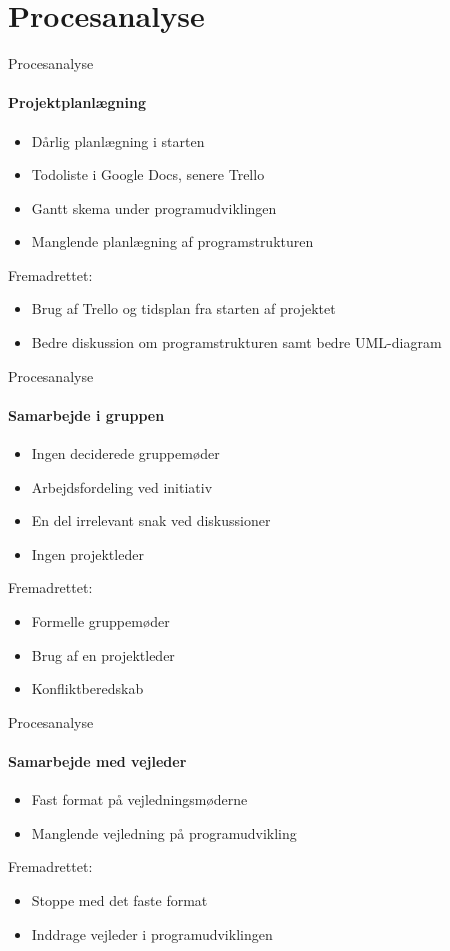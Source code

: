 \section{Procesanalyse}
\begin{frame}{Procesanalyse}
	\framesubtitle{Projektplanlægning}
	
	\begin{itemize}
		\item Dårlig planlægning i starten
		\item Todoliste i Google Docs, senere Trello
		\item Gantt skema under programudviklingen
		\item Manglende planlægning af programstrukturen
	\end{itemize}
		Fremadrettet:
	\begin{itemize}
		\item Brug af Trello og tidsplan fra starten af projektet
		\item Bedre diskussion om programstrukturen samt bedre UML-diagram
	\end{itemize}


\end{frame}

\begin{frame}{Procesanalyse}
	\framesubtitle{Samarbejde i gruppen}
	
	\begin{itemize}
		\item Ingen deciderede gruppemøder
		\item Arbejdsfordeling ved initiativ
		\item En del irrelevant snak ved diskussioner
		\item Ingen projektleder
	\end{itemize}
		Fremadrettet:
	\begin{itemize}
		\item Formelle gruppemøder
		\item Brug af en projektleder
		\item Konfliktberedskab
	\end{itemize}


\end{frame}

\begin{frame}{Procesanalyse}
	\framesubtitle{Samarbejde med vejleder}
	
	\begin{itemize}
		\item Fast format på vejledningsmøderne
		\item Manglende vejledning på programudvikling
	\end{itemize}
		Fremadrettet:
	\begin{itemize}
		\item Stoppe med det faste format
		\item Inddrage vejleder i programudviklingen
	\end{itemize}

\end{frame}

